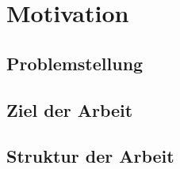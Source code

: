 \chapter{Motivation}
\section{Problemstellung}
\section{Ziel der Arbeit}
\section{Struktur der Arbeit}